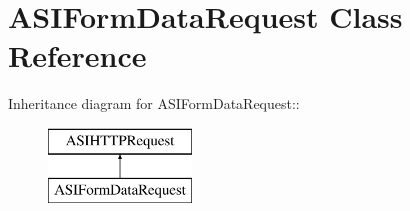 \hypertarget{interface_a_s_i_form_data_request}{
\section{ASIFormDataRequest Class Reference}
\label{interface_a_s_i_form_data_request}
}
Inheritance diagram for ASIFormDataRequest::\begin{figure}[H]
\begin{center}
\leavevmode
\includegraphics[height=2cm]{interface_a_s_i_form_data_request}
\end{center}
\end{figure}
